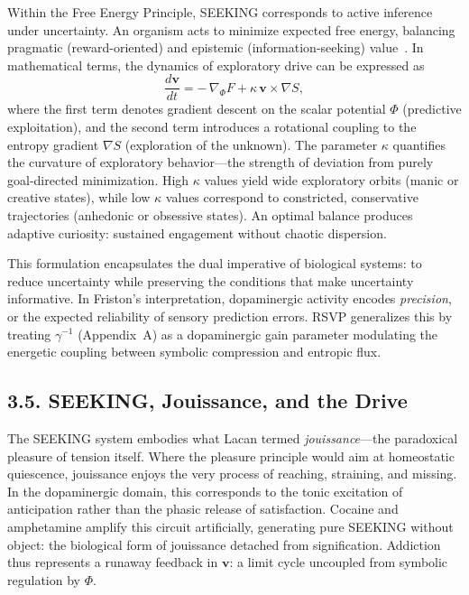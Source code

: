\documentclass[12pt,a4paper]{article}
\begin{document}
Within the Free Energy Principle, SEEKING corresponds to active inference under uncertainty.  
An organism acts to minimize expected free energy, balancing pragmatic (reward-oriented) and epistemic (information-seeking) value~\citep{friston2017dopamine}.  
In mathematical terms, the dynamics of exploratory drive can be expressed as
\[
\frac{d\mathbf{v}}{dt}
= -\,\nabla_{\Phi} F
+ \kappa\,\mathbf{v} \times \nabla S,
\]
where the first term denotes gradient descent on the scalar potential \(\Phi\) (predictive exploitation), and the second term introduces a rotational coupling to the entropy gradient \(\nabla S\) (exploration of the unknown).  
The parameter \(\kappa\) quantifies the curvature of exploratory behavior—the strength of deviation from purely goal-directed minimization.  
High \(\kappa\) values yield wide exploratory orbits (manic or creative states), while low \(\kappa\) values correspond to constricted, conservative trajectories (anhedonic or obsessive states).  
An optimal balance produces adaptive curiosity: sustained engagement without chaotic dispersion.

This formulation encapsulates the dual imperative of biological systems: to reduce uncertainty while preserving the conditions that make uncertainty informative.  
In Friston’s interpretation, dopaminergic activity encodes \emph{precision}, or the expected reliability of sensory prediction errors.  
RSVP generalizes this by treating \(\gamma^{-1}\) (Appendix~A) as a dopaminergic gain parameter modulating the energetic coupling between symbolic compression and entropic flux.

\subsection{3.5. SEEKING, Jouissance, and the Drive}

The SEEKING system embodies what Lacan termed \emph{jouissance}—the paradoxical pleasure of tension itself.  
Where the pleasure principle would aim at homeostatic quiescence, jouissance enjoys the very process of reaching, straining, and missing.  
In the dopaminergic domain, this corresponds to the tonic excitation of anticipation rather than the phasic release of satisfaction.  
Cocaine and amphetamine amplify this circuit artificially, generating pure SEEKING without object: the biological form of jouissance detached from signification.  
Addiction thus represents a runaway feedback in \(\mathbf{v}\): a limit cycle uncoupled from symbolic regulation by \(\Phi\).
\end{document}
